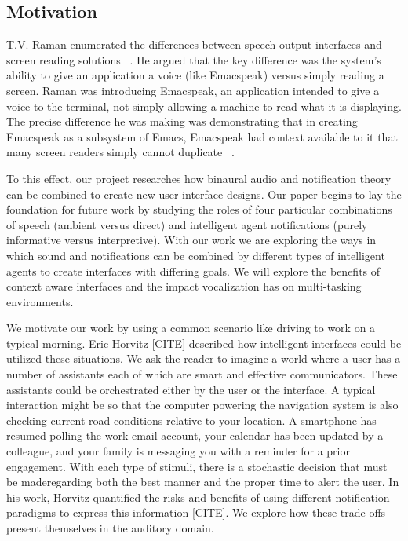 \subsection{                 Motivation                                      }

T.V. Raman enumerated the differences between speech output interfaces and
screen reading solutions ~. He argued that the key
difference was the system's ability to give an application a voice (like 
Emacspeak) versus simply reading a screen. Raman was introducing Emacspeak, an 
application intended to give a voice to the terminal, not simply allowing a 
machine to read what it is displaying. The precise difference he was making was
demonstrating that in creating Emacspeak as a subsystem of Emacs, Emacspeak had
context available to it that many screen readers simply cannot duplicate
~\cite{raman1996emacspeak}.

To this effect, our project researches how binaural audio and notification theory
can be combined to create new user interface designs. Our paper begins to lay the
foundation for future work by studying the roles of four particular combinations
of speech (ambient versus direct) and intelligent agent notifications (purely 
informative versus interpretive). With our work we are exploring the ways in which
sound and notifications can be combined by different types of intelligent agents
to create interfaces with differing goals. We will explore the benefits of context
aware interfaces and the impact vocalization has on multi-tasking environments.


We motivate our work by using a common scenario like driving to work on a typical 
morning. Eric Horvitz [CITE] described how intelligent interfaces could be utilized
these situations. We ask the reader to imagine a world where a user has a number
of assistants each of which are smart and effective communicators. These assistants
could be orchestrated either by the user or the interface. A typical interaction
might be so that the computer powering the navigation system is also checking 
current road conditions relative to your location. A smartphone has resumed polling
the work email account, your calendar has been updated by a colleague, and your 
family is messaging you with a reminder for a prior engagement.  With each type 
of stimuli, there is a stochastic decision that must be maderegarding both the 
best manner and the proper time to alert the user. In his work, Horvitz quantified
the risks and benefits of using different notification paradigms to express this 
information [CITE]. We explore how these trade offs present themselves in the
auditory domain.

